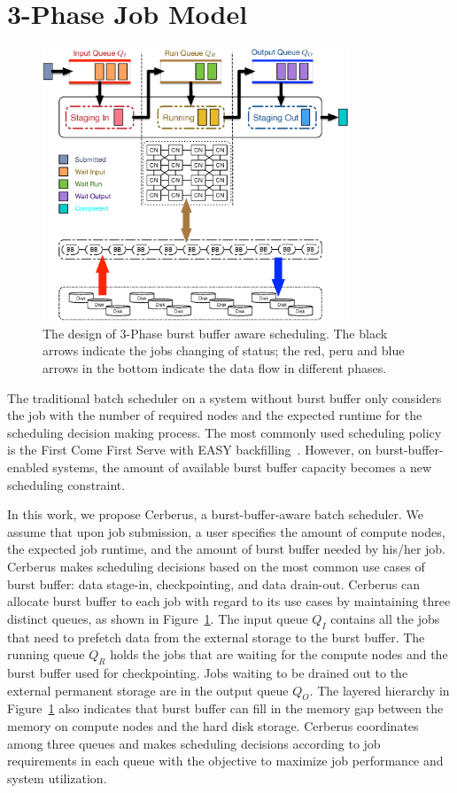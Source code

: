 \section{3-Phase Job Model}
\label{Sec:Model}

\begin{figure}[htp]
        \centering
        \includegraphics[width=3.6in]{CerberusBBSystem}
        \caption{The design of 3-Phase burst buffer aware scheduling. The black arrows indicate 
        the jobs changing of status; the red, peru and blue arrows in the bottom indicate the data flow in different phases.}
        \label{Fig:CerberusQueues}
\end{figure}

The traditional batch scheduler on a system without burst buffer only considers
the job with the number of required nodes and the expected runtime for the scheduling decision making process.
The most commonly used scheduling policy is the First Come First Serve with EASY backfilling~\cite{tsafrir-tpds-2007}.
However, on burst-buffer-enabled systems,
the amount of available burst buffer capacity becomes a new scheduling constraint.

In this work,
we propose Cerberus, a burst-buffer-aware batch scheduler.
We assume that upon job submission, 
a user specifies the amount of compute nodes, 
the expected job runtime, 
and the amount of burst buffer needed by his/her job. 
Cerberus makes scheduling decisions based on the most common use cases of burst buffer:
data stage-in, checkpointing, and data drain-out.
Cerberus can allocate burst buffer to each job with regard to its use cases
by maintaining three distinct queues, as shown in Figure~\ref{Fig:CerberusQueues}.
The input queue $Q_I$ contains all the jobs that need to prefetch data from the external storage to the burst buffer.
The running queue $Q_R$ holds the jobs that are waiting for the compute nodes and the burst buffer used for checkpointing.
Jobs waiting to be drained out to the external permanent storage are in the output queue $Q_O$.
The layered hierarchy in Figure~\ref{Fig:CerberusQueues} also indicates that burst buffer
can fill in the memory gap between the memory on compute nodes and the hard disk storage.
Cerberus coordinates among three queues and makes scheduling decisions according to job requirements in each queue with the objective to maximize job performance and system utilization.

